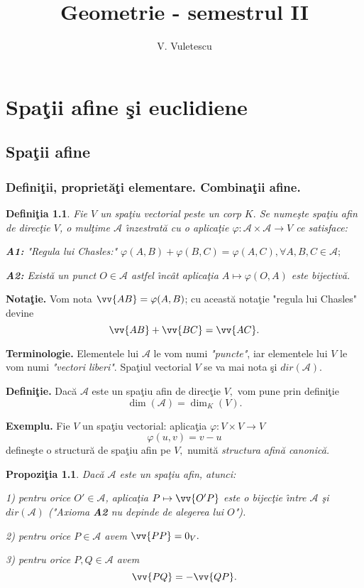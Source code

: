 \documentclass[12pt]{book}
\title{Geometrie - semestrul II}
\author{V. Vuletescu}
\date{}
\def\Ac{\mathcal A}
\def\ai{ast\-fel \^{\i}n\-c\^at }
\def\ra{\rightarrow}
\newtheorem{defi}{Defini\c tia }
\newtheorem{prop}{Propozi\c tia }
\begin{document}
\maketitle

\tableofcontents

\chapter{Spa\c tii afine \c si euclidiene}

\section{Spa\c tii afine}
\subsection{Defini\c tii, propriet\u a\c ti elementare. Combina\c tii afine.}

\begin{defi} Fie $V$ un spa\c tiu vectorial peste un corp $K.$ Se nume\c ste {\em spa\c tiu afin} de direc\c tie $V$, o mul\c time $\Ac$ \^{\i}nzestrat\u a cu o aplica\c tie $\varphi:\Ac\times \Ac \ra V$ ce satisface:

{\bf A1:} {\em "Regula lui Chasles:"} $\varphi(A, B)+\varphi(B, C)=\varphi(A, C), \forall A, B, C\in \Ac;$ 

{\bf A2:} Exist\u a un punct $O\in \Ac $ \ai aplica\c tia
$A\mapsto \varphi(O, A)$ este bijectiv\u a. 
\end{defi}


{\bf Nota\c tie.} Vom nota $\vv{AB}=\varphi(A, B)$; cu aceast\u a nota\c tie  "regula lui Chasles" devine
$$\vv{AB}+\vv{BC}=\vv{AC}.$$

{\bf Terminologie.}
Elementele lui $\Ac$ le vom numi {\em "puncte"}, iar elementele lui $V$ le vom numi {\em "vectori liberi"}.
Spa\c tiul vectorial $V$ se va mai nota \c si $dir(\Ac).$

{\bf Defini\c tie.} Dac\u a $\Ac$ este un spa\c tiu afin de direc\c tie $V,$ vom pune prin defini\c tie
$$\dim(\Ac)=\dim_K(V).$$
 
{\bf Exemplu.} Fie $V$ un spa\c tiu vectorial: aplica\c tia $\varphi:V\times V\ra V$ 
$$\varphi(u, v)=v-u$$
define\c ste o structur\u a de spa\c tiu afin pe $V,$ numit\u a {\em structura afin\u a canonic\u a.}

\begin{prop} Dac\u a $\Ac$ este un spa\c tiu afin, atunci: 

1) pentru orice $O'\in \Ac$, aplica\c tia
$P\mapsto \vv{O'P}$ este o bijec\c tie \^{\i}ntre $\Ac$ \c si $dir(\Ac)$ {\em ("Axioma {\bf A2} nu depinde de alegerea lui $O$").}

2) pentru orice $P\in \Ac$ avem $\vv{PP}=0_V.$

3) pentru orice $P, Q\in \Ac$ avem
$$\vv{PQ}=-\vv{QP}.$$
\end{prop}
\end{document}
